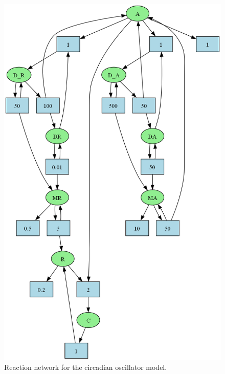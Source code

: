 \begin{figure}[H]
\begin{minipage}[t][6cm][t]{.38\textwidth}
        \includegraphics[width=\linewidth]{networks/circadianOscillator.png}
        \caption{Reaction network for the circadian oscillator model.}
        \label{fig:network_circadianOscillator}
    \end{minipage}\hfill
    \begin{minipage}[t][6cm][t]{.38\textwidth}
        \centering

\end{minipage}
\end{figure}
